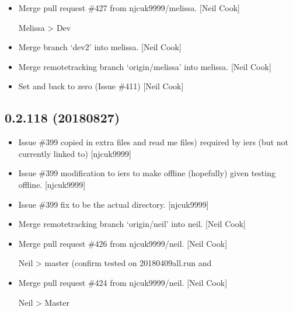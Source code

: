 \documentclass[a4paper,10pt,english]{report}
\begin{document}
\begin{itemize}
\item {} 
Merge pull request \#427 from njcuk9999/melissa. {[}Neil Cook{]}

Melissa \textendash{}\textgreater{} Dev

\item {} 
Merge branch ‘dev2’ into melissa. {[}Neil Cook{]}

\item {} 
Merge remote\sphinxhyphen{}tracking branch ‘origin/melissa’ into melissa. {[}Neil
Cook{]}

\item {} 
Set  and  back to zero (Issue \#411)
{[}Neil Cook{]}

\end{itemize}


\subsection{0.2.118 (2018\sphinxhyphen{}08\sphinxhyphen{}27)}
\label{\detokenize{misc/changelog:id368}}\begin{itemize}
\item {} 
Issue \#399 \sphinxhyphen{} copied in extra files  and read me files) required
by iers (but not currently linked to) {[}njcuk9999{]}

\item {} 
Issue \#399 \sphinxhyphen{} modification to iers to make offline (hopefully) given
testing offline. {[}njcuk9999{]}

\item {} 
Issue \#399 \sphinxhyphen{} fix  to be the actual directory.
{[}njcuk9999{]}

\item {} 
Merge remote\sphinxhyphen{}tracking branch ‘origin/neil’ into neil. {[}Neil Cook{]}

\item {} 
Merge pull request \#426 from njcuk9999/neil. {[}Neil Cook{]}

Neil \textendash{}\textgreater{} master (confirm tested on 20180409all.run and 

\item {} 
Merge pull request \#424 from njcuk9999/neil. {[}Neil Cook{]}

Neil \textendash{}\textgreater{} Master

\end{itemize}
\end{document}
